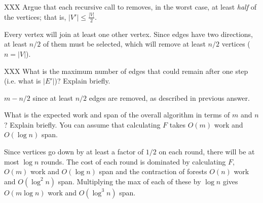 \begin{problem}[4.]
XXX
\ask
Argue that each recursive call to  removes, in the worst
case, at least \emph{half} of the vertices; that is, $|V'| \leq \frac{|V|}{2}$.

\sol
Every vertex will join at least one other vertex. Since edges have
two directions, at least $n/2$ of them must be selected, which will remove
at least $n/2$ vertices ($n = |V|$).
\end{problem}

\begin{problem}[4.]
XXX
\ask
What is the maximum number of edges that could remain after one step
(i.e. what is $|E'|$)? Explain briefly.

\sol
$m - n/2$ since at least $n/2$ edges are removed, as described in
previous answer.
\end{problem}

\begin{problem}[5.]
\ask
What is the expected work and span of the overall algorithm in terms of
$m$ and $n$? Explain briefly. You can assume that calculating $F$ takes
$O(m)$ work and $O(\log n)$ span.

\sol
Since vertices go down by at least a factor of $1/2$ on each round,
there will be at most $\log n$ rounds.  The cost of each round is
dominated by calculating $F$, $O(m)$ work and $O(\log n)$ span and the
contraction of forests $O(n)$ work and $O(\log^2 n)$ span.
Multiplying the max of each of these by $\log n$ gives $O(m \log n)$ work
and $O(\log^3 n)$ span.
\end{problem}

